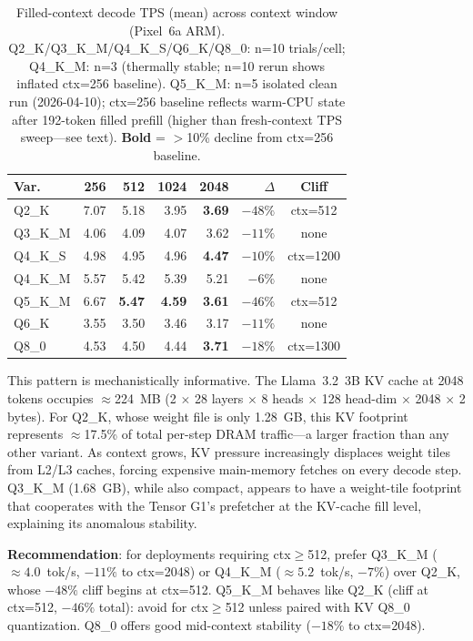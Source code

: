 \documentclass[conference]{IEEEtran}
\begin{document}
\begin{table}[h]
\centering
\caption{Filled-context decode TPS (mean) across context window (Pixel~6a ARM).
  Q2\_K/Q3\_K\_M/Q4\_K\_S/Q6\_K/Q8\_0: n=10 trials/cell;
  Q4\_K\_M: n=3 (thermally stable; n=10 rerun shows inflated ctx=256 baseline).
  Q5\_K\_M: n=5 isolated clean run (2026-04-10); ctx=256 baseline reflects warm-CPU
  state after 192-token filled prefill (higher than fresh-context TPS sweep---see text).
  \textbf{Bold} = $>$10\% decline from ctx=256 baseline.}
\label{tab:ctx2048}
\setlength{\tabcolsep}{3pt}
\footnotesize
\begin{tabular}{@{}lrrrrrc@{}}
\toprule
\textbf{Var.} & \textbf{256} & \textbf{512} & \textbf{1024} & \textbf{2048} & \textbf{$\Delta$} & \textbf{Cliff} \\
\midrule
Q2\_K    & 7.07 & 5.18 & 3.95 & \textbf{3.69} & $-48\%$ & ctx=512 \\
Q3\_K\_M & 4.06 & 4.09 & 4.07 & 3.62 & $-11\%$ & none \\
Q4\_K\_S & 4.98 & 4.95 & 4.96 & \textbf{4.47} & $-10\%$ & ctx=1200 \\
Q4\_K\_M & 5.57 & 5.42 & 5.39 & 5.21 & $-6\%$ & none \\
Q5\_K\_M & 6.67 & \textbf{5.47} & \textbf{4.59} & \textbf{3.61} & $-46\%$ & ctx=512 \\
Q6\_K    & 3.55 & 3.50 & 3.46 & 3.17 & $-11\%$ & none \\
Q8\_0    & 4.53 & 4.50 & 4.44 & \textbf{3.71} & $-18\%$ & ctx=1300 \\
\bottomrule
\end{tabular}
\end{table}

This pattern is mechanistically informative.
The Llama~3.2~3B KV cache at 2048 tokens occupies $\approx$224~MB
(2 $\times$ 28 layers $\times$ 8 heads $\times$ 128 head-dim $\times$ 2048 $\times$ 2 bytes).
For Q2\_K, whose weight file is only 1.28~GB, this KV footprint represents
$\approx$17.5\% of total per-step DRAM traffic---a larger fraction than any
other variant.  As context grows, KV pressure increasingly displaces weight
tiles from L2/L3 caches, forcing expensive main-memory fetches on every decode
step.  Q3\_K\_M (1.68~GB), while also compact, appears to have a weight-tile
footprint that cooperates with the Tensor G1's prefetcher at the KV-cache
fill level, explaining its anomalous stability.

\textbf{Recommendation}: for deployments requiring ctx$\geq$512, prefer
Q3\_K\_M (${\approx}4.0$~tok/s, $-11\%$ to ctx=2048) or Q4\_K\_M (${\approx}5.2$~tok/s,
$-7\%$) over Q2\_K, whose $-48\%$ cliff begins at ctx=512.
Q5\_K\_M behaves like Q2\_K (cliff at ctx=512, $-46\%$ total): avoid for ctx$\geq$512
unless paired with KV Q8\_0 quantization.
Q8\_0 offers good mid-context stability ($-18\%$ to ctx=2048).
\end{document}
